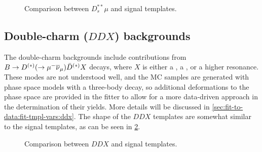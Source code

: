 \begin{figure}[htb]

    \caption{Comparison between $D_s^{**}\mu$ and \Dz\taum signal templates.}
    \label{fig:d_s-vs-d0-sig}
\end{figure}


\subsection{Double-charm ($DDX$) backgrounds}

The double-charm backgrounds include contributions from
$B \rightarrow D^{(*)}(\rightarrow {\ensuremath{\mu^-}}{\ensuremath{{\overline{\nu}}_\mu}})\bar{D}^{(*)} X$ decays, where $X$
is either a \kaon, a \Kstar, or a higher \Kstar resonance.
These modes are not understood well, and the MC samples are generated with
phase space models with a three-body decay, so additional deformations
to the phase space are provided in the fitter to allow for a more
data-driven approach in the determination of their yields.
More details will be discussed in
\cref{sec:fit-to-data:fit-tmpl-vars:ddx}.
The shape of the $DDX$ templates are somewhat similar to the signal templates,
as can be seen in \cref{fig:ddx-vs-d0-sig}.

\begin{figure}[htb]

    \caption{Comparison between $DDX$ and \Dz\taum signal templates.}
    \label{fig:ddx-vs-d0-sig}
\end{figure}
